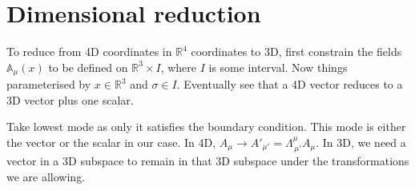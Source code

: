 \documentclass{article}
\begin{document}
\section{Dimensional reduction}
To reduce from 4D coordinates in $\mathbb{R}^{4}$ coordinates to 3D, first constrain the fields $\mathbb{A}_{\mu}(x)$ to be defined on $\mathbb{R}^{3}\times I$, where $I$ is some interval. Now things parameterised by $x\in \mathbb{R}^{3}$ and $\sigma\in I$. Eventually see that a 4D vector reduces to a 3D vector plus one scalar. \newline 

\noindent Take lowest mode as only it satisfies the boundary condition. This mode is either the vector or the scalar in our case. In 4D, $A_{\mu} \rightarrow A'_{\mu'} = \Lambda^{\mu}_{\,\mu '}A_{\mu}$. In 3D, we need a vector in a 3D subspace to remain in that 3D subspace under the transformations we are allowing. 
\end{document}
